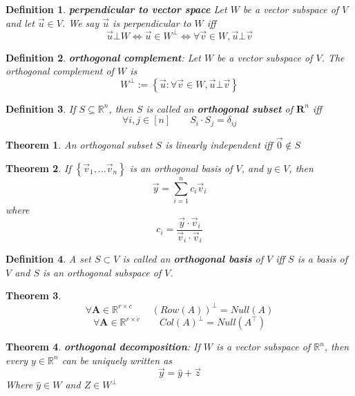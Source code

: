 \documentclass[11pt]{article}
\newtheorem{thm}{Theorem}
\newtheorem{defn}{Definition}
\begin{document}
\begin{defn}
  \textbf{perpendicular to vector space}
  Let $W$ be a vector subspace of $V$ and let $\vec{u} \in V$. We say $\vec{u}$ is perpendicular to $W$ iff
  \[\vec{u} \bot W \iff \vec{u} \in W^{\bot} \iff \forall \vec{v} \in W, \vec{u} \bot \vec{v}\]
\end{defn}

\begin{defn}
  \textbf{orthogonal complement}: Let $W$ be a vector subspace of $V$. The orthogonal complement of $W$ is
  \[W^{\bot} := \left\{\vec{u} : \forall \vec{v} \in W, \vec{u} \bot \vec{v}\right\}\]
\end{defn}


\begin{defn}
  If $S \subseteq \mathbb{R}^{n}$, then $S$ is called an \textbf{orthogonal subset} of $\mathbf{R}^{n}$ iff
  \[\forall i,j \in [n] \qquad S_{i} \cdot S_{j} = \delta_{ij}\]
\end{defn}

\begin{thm}
  An orthogonal subset $S$ is linearly independent iff $\vec{0} \notin S$
\end{thm}

\begin{thm}
  If $\left\{\vec{v}_{1}, \ldots \vec{v}_{n}\right\}$ is an orthogonal basis of $V$, and $y \in V$, then
  \[\vec{y} =\sum_{i=1}^{n} c_{i}\vec{v}_{i}\]
  where
  \[c_{i} = \frac{\vec{y} \cdot \vec{v}_{i}}{\vec{v}_{i} \cdot \vec{v}_{i}}\]
\end{thm}
\begin{defn}
  A set $S \subset V$ is called an \textbf{orthogonal basis} of $V$ iff $S$ is a basis of $V$ and $S$ is an orthogonal subspace of $V$.
\end{defn}

\begin{thm}
  \[\forall \mathbf{A} \in \mathbb{R}^{r \times c} \qquad (Row(A))^{\bot} = Null(A)\]
  \[\forall \mathbf{A} \in \mathbb{R}^{r \times c} \qquad Col(A)^{\bot} = Null(A^{\top})\]
\end{thm}
\begin{thm}
  \textbf{orthogonal decomposition}:
  If $W$ is a vector subspace of $\mathbb{R}^{n}$, then every $y \in \mathbb{R}^{n}$ can be uniquely written as
  \[\vec{y} = \hat{y} + \vec{z}\]
  Where $\hat{y} \in W$ and $Z \in W^{\bot}$
\end{thm}
\end{document}
